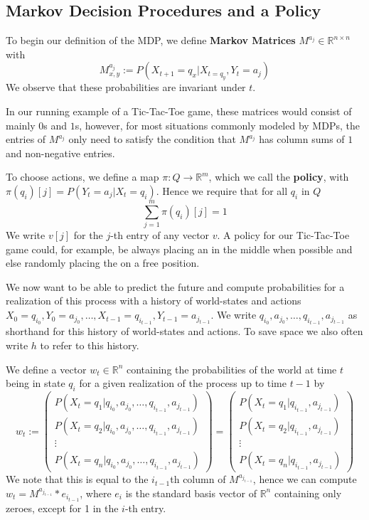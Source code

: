 \documentclass{article}
\theoremstyle{definition}
\def\ticX{\text{${\times}$}}
\begin{document}
\subsection{Markov Decision Procedures and a Policy}
To begin our definition of the MDP, we define {\bf{Markov Matrices}} $M^{a_j}\in \mathbb{R}^{n \times n}$ with 
\[
M^{a_j}_{x,y}:=P(X_{t+1}=q_x|X_{t=q_y},Y_t=a_j)
\]
We observe that these probabilities are invariant under $t$.  

In our running example of a Tic-Tac-Toe game, these matrices would consist of mainly $0$s and $1$s, however, for most situations commonly modeled by MDPs, the entries of $M^{a_j}$ only need to satisfy the condition that $M^{a_j}$ has column sums of $1$ and non-negative entries. 

To choose actions, we define a map $\pi:Q\rightarrow \mathbb{R}^{m}$, which we call the {\bf{policy}}, with $\pi(q_i)[j]=P(Y_t=a_j|X_t=q_i)$. Hence we require that for all $q_i$ in $Q$
\[
\sum\limits_{j=1}^{m} \pi(q_i)[j] =1 
\]
We write $v[j]$ for the $j$-th entry of any vector $v$.
A policy for our Tic-Tac-Toe game could, for example, be always placing an {\ticX} in the middle when possible and else randomly placing the {\ticX} on a free position. 

We now want to be able to predict the future and compute probabilities for a realization of this process with a history of world-states and actions $X_0=q_{i_0},Y_0={a_{j_0}},\ldots,X_{t-1}=q_{i_{t-1}},Y_{t-1}=a_{j_{t-1}}$. We write $q_{i_0},a_{j_0},\ldots,q_{i_{t-1}},a_{j_{t-1}}$ as shorthand for this history of world-states and actions. To save space we also often write $h$ to refer to this history.
 
We define a vector $w_t\in \mathbb{R}^{n}$ containing the probabilities of the world at time $t$ being in state $q_i$ for a given realization of the process up to time $t-1$ by
\[
w_t:=
\left (
\begin{matrix}
P(X_t=q_1|q_{i_0},a_{j_0},\ldots,q_{i_{t-1}},a_{j_{t-1}}) \\
P(X_t=q_2|q_{i_0},a_{j_0},\ldots,q_{i_{t-1}},a_{j_{t-1}}) \\
\vdots \\
P(X_t=q_n|q_{i_0},a_{j_0},\ldots,q_{i_{t-1}},a_{j_{t-1}})
\end{matrix}
\right )
=
\left (
\begin{matrix}
P(X_t=q_1|q_{i_{t-1}},a_{j_{t-1}}) \\
P(X_t=q_2|q_{i_{t-1}},a_{j_{t-1}}) \\
\vdots \\
P(X_t=q_n|q_{i_{t-1}},a_{j_{t-1}})
\end{matrix}
\right )
\]
We note that this is equal to the $i_{t-1}$th column of $M^{a_{j_{t-1}}}$, hence we can compute $w_t=M^{a_{j_{t-1}}}*e_{i_{t-1}}$, where $e_i$ is the standard basis vector of $\mathbb{R}^{n}$ containing only zeroes, except for 1 in the $i$-th entry. 
\end{document}
